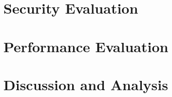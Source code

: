 \section{Security Evaluation}



\section{Performance Evaluation}



\section{Discussion and Analysis}




